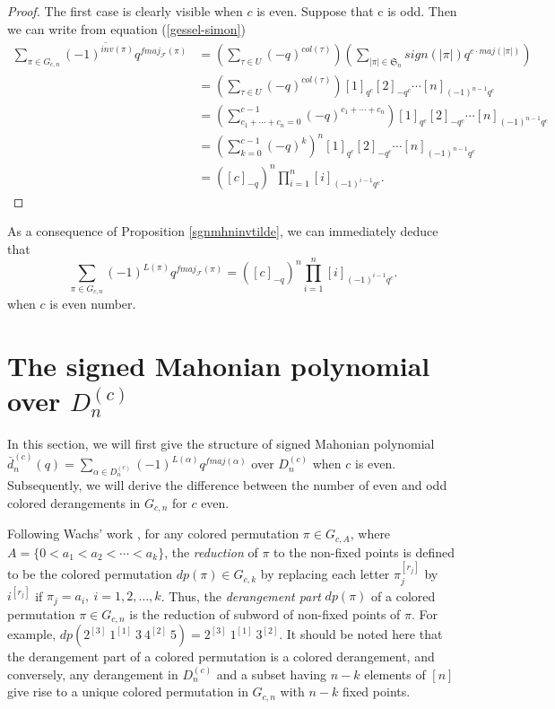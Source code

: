 \documentclass[a4paper,12pt]{article}
\begin{document}
\begin{proof}
The first case is clearly visible when $c$ is even. Suppose that c is odd. Then we can write from equation (\ref{gessel-simon})
\begin{align*}
  \sum_{\pi \in G_{c,n}}(-1)^{\widetilde{inv}(\pi)}q^{fmaj_{\mathcal{F}}(\pi)}&=\left(\sum_{\tau \in U}(-q)^{col(\tau)}\right)\left(\sum_{|\pi| \in \mathfrak{S}_n}sign(|\pi|)q^{c \cdot maj(|\pi|)}\right)  \\
  &=\left(\sum_{\tau \in U}(-q)^{col(\tau)}\right)[1]_{q^c}[2]_{-{q^c}}\cdots [n]_{(-1)^{n-1}{q^c}}   \\ 
  &=\left(\sum_{c_1+\cdots +c_n=0}^{c-1}(-q)^{c_1+\cdots +c_n}\right)[1]_{q^c}[2]_{-{q^c}}\cdots [n]_{(-1)^{n-1}{q^c}}\\
  &=\left( \sum_{k=0}^{c-1}(-q)^k\right)^n [1]_{q^c}[2]_{-{q^c}}\cdots [n]_{(-1)^{n-1}{q^c}}\\
   &=\left([c]_{-q}\right)^n \prod_{i=1}^{n} [i]_{(-1)^{i-1} q^c}.
\end{align*}
\end{proof}

 As a consequence of Proposition \ref{sgnmhninvtilde}, we can immediately deduce that
\begin{equation*}
\sum_{\pi \in G_{c,n}} (-1)^{L(\pi)} q^{fmaj_{\mathcal{F}}(\pi)}=\left([c]_{-q}\right)^n\prod_{i=1}^{n} [i]_{(-1)^{i-1} q^c}.
\end{equation*}   
when $c$ is even number.



\section{The signed Mahonian polynomial over $D_{n}^{(c)}$}

In this section, we will first give the structure of signed Mahonian polynomial $\bar{d}_{n}^{(c)}(q)=\sum_{\alpha \in D_{n}^{(c)}}(-1)^{L(\alpha)}q^{fmaj(\alpha)}$ over $D_{n}^{(c)}$ when $c$ is even. Subsequently, we will derive the difference between the number of even and odd colored derangements in $G_{c,n}$ for $c$ even.


Following Wachs' work \cite{wachs1989}, for any colored permutation $\pi \in G_{c,A}$, where $A=\{0<a_1<a_2<\cdots < a_k\}$, the \textit{reduction} of $\pi$ to the non-fixed points is defined to be the colored permutation $dp(\pi) \in G_{c,k}$ by replacing each letter $\pi_j^{[r_j]}$ by $i^{[r_j]}$ if $\pi_j=a_i,~i=1,2,\dots,k$. Thus, the \textit{derangement part} $dp(\pi)$ of a colored permutation $\pi \in G_{c,n}$ is the reduction of subword of non-fixed points of $\pi$. For example, $dp(2^{[3]} ~1^{[1]} ~3~4^{[2]}~5)=2^{[3]} ~1^{[1]} ~3^{[2]}$. It should be noted here that the derangement part of a colored permutation is a colored derangement, and conversely, any derangement in $D_{n}^{(c)}$ and a subset having $n-k$ elements of $[n]$ give rise to a unique colored permutation in $G_{c,n}$ with $n-k$ fixed points. 
\end{document}
